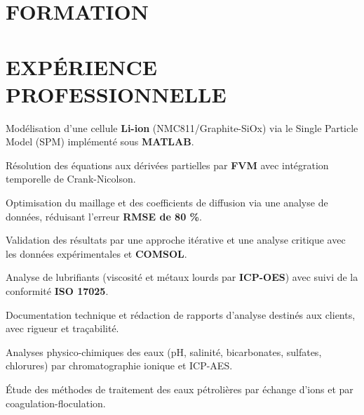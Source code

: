 \documentclass[10pt]{article}
\begin{document}

\section{FORMATION}

\section{EXPÉRIENCE PROFESSIONNELLE}
\begin{bul}
\item Modélisation d'une cellule \textbf{Li-ion} (NMC811/Graphite-SiOx) via le Single Particle Model (SPM) implémenté sous \textbf{MATLAB}.
\item Résolution des équations aux dérivées partielles par \textbf{FVM} avec intégration temporelle de Crank-Nicolson.
\item Optimisation du maillage et des coefficients de diffusion via une analyse de données, réduisant l'erreur \textbf{RMSE de 80 \%}.
\item Validation des résultats par une approche itérative et une analyse critique avec les données expérimentales et \textbf{COMSOL}.
\end{bul}
\begin{bul}
\item Analyse de lubrifiants (viscosité et métaux lourds par \textbf{ICP-OES}) avec suivi de la conformité \textbf{ISO 17025}.
\item Documentation technique et rédaction de rapports d'analyse destinés aux clients, avec rigueur et traçabilité.
\end{bul}
\begin{bul}
\item Analyses physico-chimiques des eaux (pH, salinité, bicarbonates, sulfates, chlorures) par chromatographie ionique et ICP-AES.
\item Étude des méthodes de traitement des eaux pétrolières par échange d'ions et par coagulation-floculation.
\end{bul}
\end{document}
